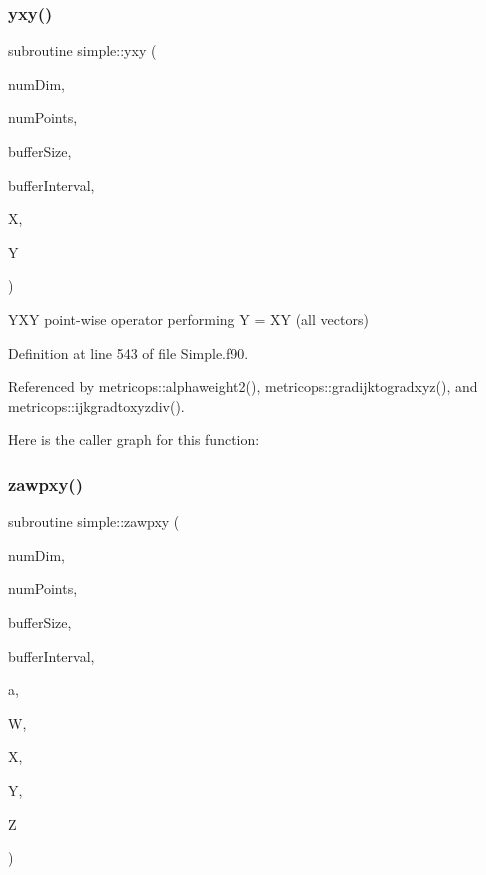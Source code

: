 \subsubsection{\texorpdfstring{yxy()}{yxy()}}
{\footnotesize\ttfamily subroutine simple\+::yxy (\begin{DoxyParamCaption}\item[{integer(kind=4), intent(in)}]{num\+Dim,  }\item[{integer(kind=8), intent(in)}]{num\+Points,  }\item[{integer(kind=8), dimension(numdim), intent(in)}]{buffer\+Size,  }\item[{integer(kind=8), dimension(2$\ast$numdim), intent(in)}]{buffer\+Interval,  }\item[{real(kind=8), dimension(numpoints), intent(in)}]{X,  }\item[{real(kind=8), dimension(numpoints), intent(inout)}]{Y }\end{DoxyParamCaption})}



Y\+XY point-\/wise operator performing Y = XY (all vectors) 



Definition at line 543 of file Simple.\+f90.



Referenced by metricops\+::alphaweight2(), metricops\+::gradijktogradxyz(), and metricops\+::ijkgradtoxyzdiv().

Here is the caller graph for this function\+:
\hypertarget{namespacesimple_a2cc011ac7ff8b94457ce2aa0ea49a2e2}{}\label{namespacesimple_a2cc011ac7ff8b94457ce2aa0ea49a2e2} 
\subsubsection{\texorpdfstring{zawpxy()}{zawpxy()}}
{\footnotesize\ttfamily subroutine simple\+::zawpxy (\begin{DoxyParamCaption}\item[{integer(kind=4), intent(in)}]{num\+Dim,  }\item[{integer(kind=8), intent(in)}]{num\+Points,  }\item[{integer(kind=8), dimension(numdim), intent(in)}]{buffer\+Size,  }\item[{integer(kind=8), dimension(2$\ast$numdim), intent(in)}]{buffer\+Interval,  }\item[{real(kind=8), intent(in)}]{a,  }\item[{real(kind=8), dimension(numpoints), intent(in)}]{W,  }\item[{real(kind=8), dimension(numpoints), intent(in)}]{X,  }\item[{real(kind=8), dimension(numpoints), intent(in)}]{Y,  }\item[{real(kind=8), dimension(numpoints), intent(out)}]{Z }\end{DoxyParamCaption})}



